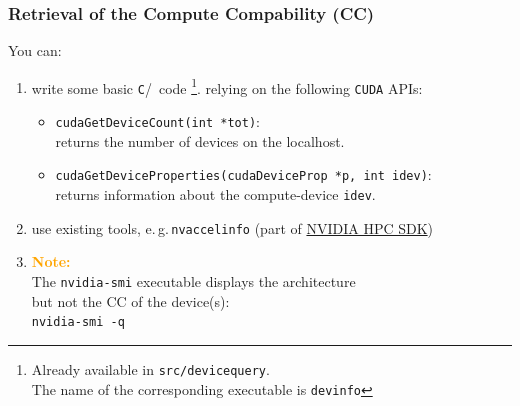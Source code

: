 \begin{frame}
	\frametitle{Retrieval of the Compute Compability (CC)}
      You can:	
      \begin{enumerate}
	      \item write some basic \texttt{C}/\CC\ code \footnote{Already available in \texttt{src/devicequery}.\\
		      \hspace{4ex}The name of the corresponding executable is \texttt{devinfo}}. 
   	    relying on the following \texttt{CUDA} APIs:\\
   	      \begin{itemize}    
  	         \item \lstinline[style=MyCudaStyle]|cudaGetDeviceCount(int *tot)|: \\
	  	       returns the number of devices on the localhost.
   	         \item \lstinline[style=MyCudaStyle]|cudaGetDeviceProperties(cudaDeviceProp *p, int idev)|: \\
		       returns information about the compute-device \lstinline[style=MyCudaStyle]|idev|.
              \end{itemize}
          \item use existing tools, e.\,g.\,\texttt{nvaccelinfo} 
		(part of \href{https://developer.nvidia.com/hpc-sdk}{NVIDIA HPC SDK}) 

          \item \textbf{\textcolor{orange}{Note:}}\\
               The \texttt{nvidia-smi} executable displays the architecture \\ 
		      but not the CC of the device(s): \\
               \texttt{nvidia-smi -q}		      
      \end{enumerate}
\end{frame}	


